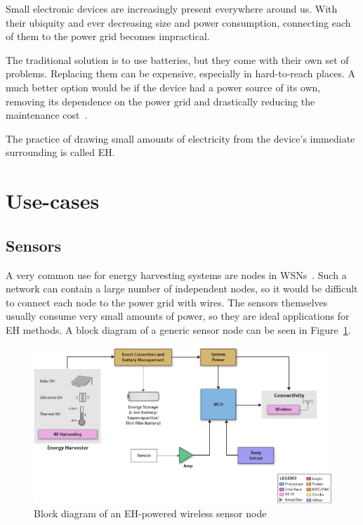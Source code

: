 \documentclass[a4paper,10pt]{article}
\begin{document}
Small electronic devices are increasingly present everywhere around us. With their ubiquity and ever decreasing size and power consumption, connecting each of them to the power grid becomes impractical. 

The traditional solution is to use batteries, but they come with their own set of problems. Replacing them can be expensive, especially in hard-to-reach places. A much better option would be if the device had a power source of its own, removing its dependence on the power grid and drastically reducing the maintenance cost~\cite{Burgoine11}. 

The practice of drawing small amounts of electricity from the device's immediate surrounding is called \ac{EH}. 

\section{Use-cases}

\subsection{Sensors}

A very common use for energy harvesting systems are nodes in \acp{WSN}~\cite{teg-wsn-ieee,cap-wsn-ieee}. Such a network can contain a large number of independent nodes, so it would be difficult to connect each node to the power grid with wires. The sensors themselves usually consume very small amounts of power, so they are ideal applications for \acl{EH} methods. A block diagram of a generic sensor node can be seen in Figure~\ref{fig:block-sensor}. 

\begin{figure}[!h]
 \centering
\includegraphics[width=.9\textwidth]{./Slike/EH-Block}
\caption{Block diagram of an \ac{EH}-powered wireless sensor node~\cite{ti:eh}}
\label{fig:block-sensor}
\end{figure}
\end{document}
